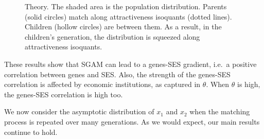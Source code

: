 \documentclass[
]{article}
\theoremstyle{definition}
\theoremstyle{definition}
\theoremstyle{definition}
\theoremstyle{definition}
\theoremstyle{remark}
\begin{document}
\begin{figure}

{\centering {}

}

\caption{Theory. The shaded area is the population distribution. Parents (solid circles) match along attractiveness isoquants (dotted lines). Children (hollow circles) are between them. As a result, in the children's generation, the distribution is squeezed along attractiveness isoquants.}\label{fig:pic-intuition}
\end{figure}

These results show that SGAM can lead to a genes-SES gradient, i.e.~a positive
correlation between genes and SES. Also, the strength of the genes-SES
correlation is affected by economic institutions, as captured in \(\theta\).
When \(\theta\) is high, the genes-SES correlation is high too.

We now consider the asymptotic distribution of \(x_1\) and \(x_2\) when the matching
process is repeated over many generations. As we would expect, our main results
continue to hold.
\end{document}
